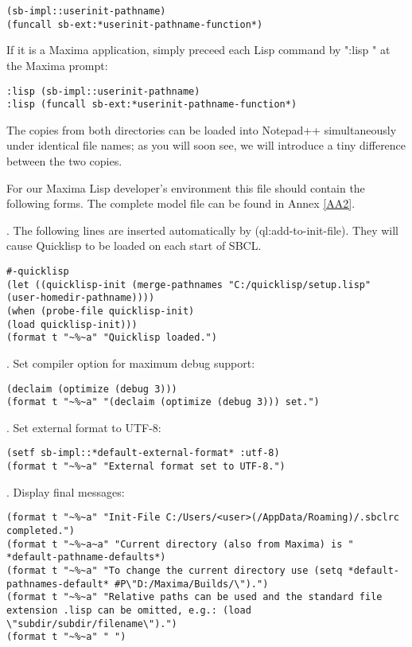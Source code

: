 \documentclass[../Maxima_Workbook.tex]{subfiles}
\begin{document}
\begin{lstlisting}[style=lisp]
(sb-impl::userinit-pathname)
(funcall sb-ext:*userinit-pathname-function*)
\end{lstlisting}

If it is a Maxima application, simply preceed each Lisp command by ":lisp " at the Maxima prompt:
\begin{lstlisting}[style=lisp]
:lisp (sb-impl::userinit-pathname)
:lisp (funcall sb-ext:*userinit-pathname-function*)
\end{lstlisting}
The copies from both directories can be loaded into Notepad++ simultaneously under identical file names; as you will soon see, we will introduce a tiny difference between the two copies.

\lz For our Maxima Lisp developer's environment this file should contain the following forms. The complete model file can be found in Annex \ref{AA2}.

. The following lines are inserted automatically by (ql:add-to-init-file). They will cause Quicklisp to be loaded on each start of SBCL.

\begin{lstlisting}[style=lisp]
#-quicklisp
(let ((quicklisp-init (merge-pathnames "C:/quicklisp/setup.lisp" (user-homedir-pathname))))
(when (probe-file quicklisp-init)
(load quicklisp-init)))
(format t "~%~a" "Quicklisp loaded.")
\end{lstlisting}

. Set compiler option for maximum debug support:

\begin{lstlisting}[style=lisp]
(declaim (optimize (debug 3)))
(format t "~%~a" "(declaim (optimize (debug 3))) set.")
\end{lstlisting}

. Set external format to UTF-8:

\begin{lstlisting}[style=lisp]
(setf sb-impl::*default-external-format* :utf-8)
(format t "~%~a" "External format set to UTF-8.")
\end{lstlisting}

. Display final messages:

\begin{lstlisting}[style=lisp]
(format t "~%~a" "Init-File C:/Users/<user>(/AppData/Roaming)/.sbclrc completed.")
(format t "~%~a~a" "Current directory (also from Maxima) is " *default-pathname-defaults*)
(format t "~%~a" "To change the current directory use (setq *default-pathnames-default* #P\"D:/Maxima/Builds/\").")
(format t "~%~a" "Relative paths can be used and the standard file extension .lisp can be omitted, e.g.: (load \"subdir/subdir/filename\").")
(format t "~%~a" " ")
\end{lstlisting}
\end{document}
